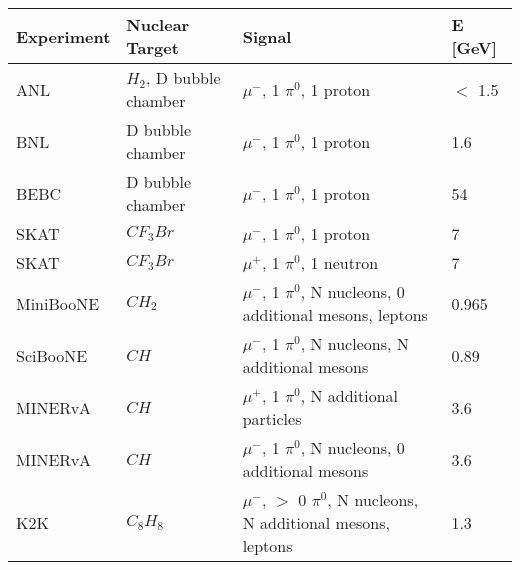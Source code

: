 \documentclass{article}
\begin{document}
\begin{table*} 
 \centering
 \begin{tabular}{| l | l | l | l |}
  \hline
   Experiment & Nuclear Target & Signal & E [GeV]\\ [0.1ex] \hline
 ANL \cite{bib:ANL1} & $H_2$, D bubble chamber & $\mu^-$, 1 $\pi^0$, 1 proton & $<$ 1.5 \\ 
 BNL \cite{bib:ANL2} & D bubble chamber & $\mu^-$, 1 $\pi^0$, 1 proton & 1.6 \\ 
 BEBC \cite{bib:HE_unknown1} & D bubble chamber & $\mu^-$, 1 $\pi^0$, 1 proton & 54 \\ 
 SKAT \cite{bib:HE_unknown2} & $CF_{3}Br$ & $\mu^-$, 1 $\pi^0$, 1 proton & 7 \\ 
 SKAT \cite{bib:HE_unknown2} & $CF_{3}Br$ & $\mu^+$, 1 $\pi^0$, 1 neutron & 7 \\ 
 MiniBooNE \cite{bib:miniboone_thesis} & $CH_2$ & $\mu^-$, 1 $\pi^0$, N nucleons, 0 additional mesons, leptons & 0.965 \\ 
 SciBooNE \cite{bib:sciboone_thesis} & $CH$ & $\mu^-$, 1 $\pi^0$, N nucleons, N additional mesons  & 0.89 \\
  MINERvA \cite{bib:minerva_thesis} & $CH$ & $\mu^+$, 1 $\pi^0$, N additional particles & 3.6 \\ 
  MINERvA \cite{bib:minerva_paper_2017} & $CH$ & $\mu^-$, 1 $\pi^0$, N nucleons, 0 additional mesons & 3.6 \\ 
 K2K \cite{bib:k2k_paper} & $C_{8}H_{8}$ & $\mu^-$, $>$ 0 $\pi^0$, N nucleons, N additional mesons, leptons & 1.3 \\ 
\hline

\end{tabular}
\end{table*}
\end{document}
